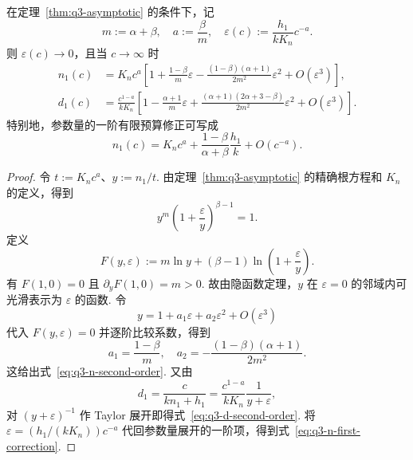 \begin{corollary}[质量饱和分支的二阶高预算展开]\label{cor:q3-second-order-asymptotic}
在定理~\ref{thm:q3-asymptotic} 的条件下，记
\[
m:=\alpha+\beta,\quad a:=\frac{\beta}{m},\quad
\varepsilon(c):=\frac{h_1}{kK_n}c^{-a}.
\]
则 $\varepsilon(c)\to0$，且当 $c\to\infty$ 时
\begin{subequations}
    \begin{align}
 n_1(c) &=K_n c^a\left[ 1+\frac{1-\beta}{m}\varepsilon -\frac{(1-\beta)(\alpha+1)}{2m^2}\varepsilon^2 +O(\varepsilon^3) \right],\label{eq:q3-n-second-order}\\
 d_1(c)&=\frac{c^{1-a}}{kK_n}\left[1-\frac{\alpha+1}{m}\varepsilon+\frac{(\alpha+1)(2\alpha+3-\beta)}{2m^2}\varepsilon^2 +O(\varepsilon^3) \right].\label{eq:q3-d-second-order}
\end{align}
\end{subequations}
特别地，参数量的一阶有限预算修正可写成
\begin{equation}\label{eq:q3-n-first-correction}
 n_1(c)=K_n c^a
 +\frac{1-\beta}{\alpha+\beta}\frac{h_1}{k}
 +O(c^{-a}).
\end{equation}
\end{corollary}
\begin{proof}
令 $t:=K_n c^a$、$y:=n_1/t$. 由定理~\ref{thm:q3-asymptotic} 的精确根方程和 $K_n$ 的定义，得到
\[
y^m\left(1+\frac{\varepsilon}{y}\right)^{\beta-1}=1.
\]
定义
\begin{equation*}
    F(y,\varepsilon):=m\ln y+(\beta-1)\ln\left(1+\frac{\varepsilon}{y}\right).
\end{equation*}
有 $F(1,0)=0$ 且 $\partial_yF(1,0)=m>0$. 故由隐函数定理，$y$ 在 $\varepsilon=0$ 的邻域内可光滑表示为 $\varepsilon$ 的函数. 令
\begin{equation}
    y=1+a_1\varepsilon+a_2\varepsilon^2+O(\varepsilon^3)
\end{equation}
代入 $F(y,\varepsilon)=0$ 并逐阶比较系数，得到
\begin{equation*}
    a_1=\frac{1-\beta}{m},\quad a_2=-\frac{(1-\beta)(\alpha+1)}{2m^2}.
\end{equation*}
这给出式~\eqref{eq:q3-n-second-order}. 又由
\begin{equation*}
    d_1=\frac{c}{kn_1+h_1}=\frac{c^{1-a}}{kK_n}\frac{1}{y+\varepsilon},
\end{equation*}
对 $(y+\varepsilon)^{-1}$ 作 Taylor 展开即得式~\eqref{eq:q3-d-second-order}. 将 $\varepsilon=(h_1/(kK_n))c^{-a}$ 代回参数量展开的一阶项，得到式~\eqref{eq:q3-n-first-correction}. 
\end{proof}

